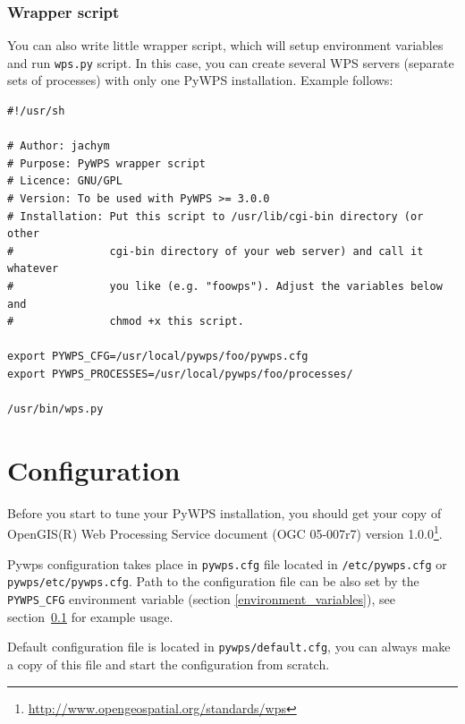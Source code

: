 \documentclass[a4paper,11pt]{report}
\begin{document}
\subsection{Wrapper script}
\label{wrapper_script}
You can also write little wrapper script, which will setup environment
variables and run \texttt{wps.py} script. In this case, you can create
several WPS servers  (separate sets of processes) with only one PyWPS
installation. Example follows:
\begin{verbatim}
#!/usr/sh

# Author: jachym
# Purpose: PyWPS wrapper script
# Licence: GNU/GPL
# Version: To be used with PyWPS >= 3.0.0
# Installation: Put this script to /usr/lib/cgi-bin directory (or other
#               cgi-bin directory of your web server) and call it whatever
#               you like (e.g. "foowps"). Adjust the variables below and 
#               chmod +x this script.

export PYWPS_CFG=/usr/local/pywps/foo/pywps.cfg
export PYWPS_PROCESSES=/usr/local/pywps/foo/processes/

/usr/bin/wps.py
\end{verbatim}

\chapter{Configuration}
\label{configuration}
    
Before you start to tune your PyWPS installation, you should get your copy of
OpenGIS(R) Web Processing Service document (OGC  05-007r7) version
1.0.0\footnote{\url{http://www.opengeospatial.org/standards/wps}}.
    
    
Pywps configuration takes place in \texttt{pywps.cfg} file located in
\texttt{/etc/pywps.cfg} or \texttt{pywps/etc/pywps.cfg}. Path to the
configuration file can be also set by the \texttt{PYWPS\_CFG} environment
variable (section \ref{environment_variables}), see
section~\ref{wrapper_script} for example usage.

Default configuration file is located in \texttt{pywps/default.cfg}, you
can always make a copy of this file and start the configuration from
scratch.
    
\end{document}
